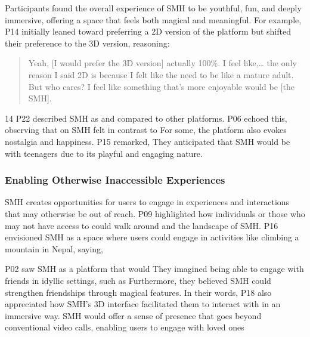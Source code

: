 Participants found the overall experience of SMH to be youthful, fun, and deeply immersive, offering a space that feels both magical and meaningful. For example, P14 initially leaned toward preferring a 2D version of the platform but shifted their preference to the 3D version, reasoning: \blockquote{Yeah, [I would prefer the 3D version] actually 100\%. I feel like,\ldots{} the only reason I said 2D is because I felt like the need to be like a mature adult. But who cares? I feel like something that's more enjoyable would be [the SMH].}{14} P22 described SMH as    and  compared to other platforms. P06 echoed this, observing that  on SMH felt  in contrast to  For some, the platform also evokes nostalgia and happiness. P15 remarked,  They anticipated that SMH would be  with teenagers due to its playful and engaging nature.

\subsubsection{Enabling Otherwise Inaccessible Experiences}
\label{lab:4-6-3}
SMH creates opportunities for users to engage in experiences and interactions that may otherwise be out of reach. P09 highlighted how individuals  or those who may not have access to  could walk around and  the  landscape of SMH. P16 envisioned SMH as a space where users could engage in activities like climbing a mountain in Nepal, saying,  

P02 saw SMH as a platform that would  They imagined being able to engage with friends in idyllic settings, such as  Furthermore, they believed SMH could strengthen friendships through magical features. In their words,  P18 also appreciated how SMH's 3D interface facilitated them to interact with  in an immersive way. SMH would offer a sense of presence that goes beyond conventional video calls, enabling users to engage with loved ones 